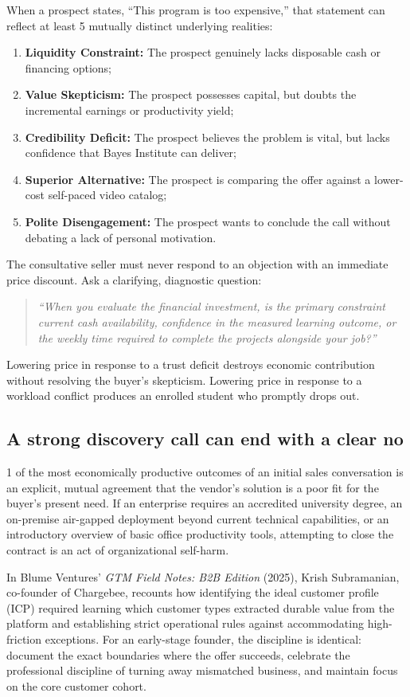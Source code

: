 When a prospect states, ``This program is too expensive,'' that statement can reflect at least 5 mutually distinct underlying realities:
\begin{enumerate}
\item \textbf{Liquidity Constraint:} The prospect genuinely lacks disposable cash or financing options;
\item \textbf{Value Skepticism:} The prospect possesses capital, but doubts the incremental earnings or productivity yield;
\item \textbf{Credibility Deficit:} The prospect believes the problem is vital, but lacks confidence that Bayes Institute can deliver;
\item \textbf{Superior Alternative:} The prospect is comparing the offer against a lower-cost self-paced video catalog;
\item \textbf{Polite Disengagement:} The prospect wants to conclude the call without debating a lack of personal motivation.
\end{enumerate}
The consultative seller must never respond to an objection with an immediate price discount. Ask a clarifying, diagnostic question:
\begin{quote}
\textit{``When you evaluate the financial investment, is the primary constraint current cash availability, confidence in the measured learning outcome, or the weekly time required to complete the projects alongside your job?''}
\end{quote}
Lowering price in response to a trust deficit destroys economic contribution without resolving the buyer's skepticism. Lowering price in response to a workload conflict produces an enrolled student who promptly drops out.

\subsection{A strong discovery call can end with a clear no}

1 of the most economically productive outcomes of an initial sales conversation is an explicit, mutual agreement that the vendor's solution is a poor fit for the buyer's present need. If an enterprise requires an accredited university degree, an on-premise air-gapped deployment beyond current technical capabilities, or an introductory overview of basic office productivity tools, attempting to close the contract is an act of organizational self-harm.

In Blume Ventures' \textit{GTM Field Notes: B2B Edition} (2025), Krish Subramanian, co-founder of Chargebee, recounts how identifying the ideal customer profile (ICP) required learning which customer types extracted durable value from the platform and establishing strict operational rules against accommodating high-friction exceptions. For an early-stage founder, the discipline is identical: document the exact boundaries where the offer succeeds, celebrate the professional discipline of turning away mismatched business, and maintain focus on the core customer cohort.

